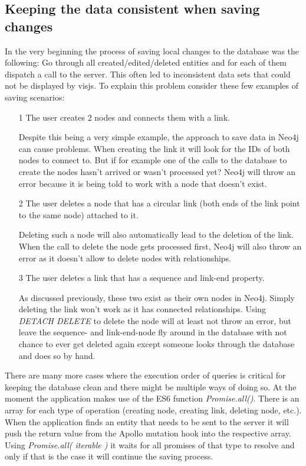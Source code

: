 \subsection{Keeping the data consistent when saving changes}
In the very beginning the process of saving local changes to the database was the following: Go through all created/edited/deleted entities and for each of them dispatch a call to the server. This often led to inconsistent data sets that could not be displayed by visjs. To explain this problem consider these few examples of saving scenarios:
\begin{itemize}
\item[1] The user creates 2 nodes and connects them with a link.

Despite this being a very simple example, the approach to save data in Neo4j can cause problems. When creating the link it will look for the IDs of both nodes to connect to. But if for example one of the calls to the database to create the nodes hasn't arrived or wasn't processed yet? Neo4j will throw an error because it is being told to work with a node that doesn't exist.

\item[2] The user deletes a node that has a circular link (both ends of the link point to the same node) attached to it.

Deleting such a node will also automatically lead to the deletion of the link. When the call to delete the node gets processed first, Neo4j will also throw an error as it doesn't allow to delete nodes with relationships.

\item[3] The user deletes a link that has a sequence and link-end property.

As discussed previously, these two exist as their own nodes in Neo4j. Simply deleting the link won't work as it has connected relationships. Using \emph{DETACH DELETE} to delete the node will at least not throw an error, but leave the sequence- and link-end-node fly around in the database with not chance to ever get deleted again except someone looks through the database and does so by hand.
\end{itemize}

There are many more cases where the execution order of queries is critical for keeping the database clean and there might be multiple ways of doing so. At the moment the application makes use of the ES6 function \emph{Promise.all()}. There is an array for each type of operation (creating node, creating link, deleting node, etc.). When the application finds an entity that needs to be sent to the server it will push the return value from the Apollo mutation hook into the respective array. Using \emph{Promise.all( iterable )} it waits for all promises of that type to resolve and only if that is the case it will continue the saving process.

